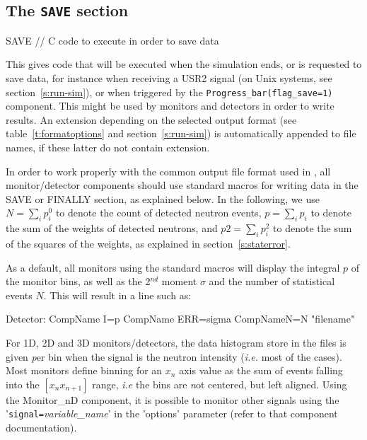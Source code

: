 \subsection{The \texttt{SAVE} section}
\label{s:comp-save}

\begin{mcstas}
SAVE
// C code to execute in order to save data 
\end{mcstas}

This gives code that will be executed when the simulation ends, or is requested
to save data, for instance when receiving a USR2 signal (on Unix systems, see
section~\ref{s:run-sim}), or when triggered by the
\texttt{Progress\_bar(flag\_save=1)} component.  This might be used by monitors
and detectors in order to write results.  An extension depending on the selected
output format (see table~\ref{t:formatoptions} and section~\ref{s:run-sim}) is
automatically appended to file names, if these latter do not contain extension.

In order to work properly with the common output file format used in
\MCS, all monitor/detector components should use standard macros for
writing data in the SAVE or FINALLY section, as explained below. In the
following, we use $N = \sum_i p_i^0$ to denote the count of detected
neutron events, $p = \sum_i p_i$ to denote the sum of the weights of
detected neutrons, and $\textit{p2} = \sum_i p_i^2$ to denote the sum of
the squares of the weights, as explained in section~\ref{s:staterror}.

As a default, all monitors using the standard macros will display the
integral $p$ of the monitor bins, as well as the 2$^{nd}$ moment $\sigma$
and the number of statistical events $N$. This will result in a line such as:

\begin{mcstas}
Detector: CompName I=p CompName ERR=sigma CompNameN=N "filename"
\end{mcstas}


For 1D, 2D and 3D monitors/detectors, the data histogram store in the files is
given {\emph per bin} when the signal is the neutron intensity ({\it i.e.} most
of the cases). Most monitors define binning for an $x_n$ axis value as the sum
of events falling into the $[ x_n x_{n+1} ]$ range, {\it i.e} the bins are
{\emph not} centered, but left aligned.  Using the Monitor\_nD component, it is
possible to monitor other signals using the '\verb+signal=+{\it variable\_name}'
in the 'options' parameter (refer to that component documentation).

